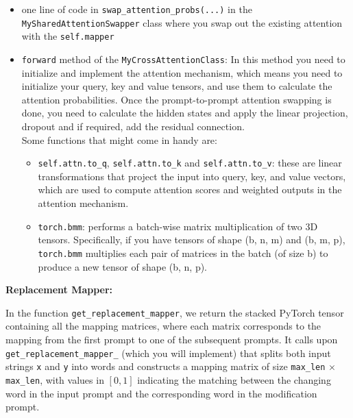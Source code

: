 \documentclass[11pt,addpoints,answers]{exam}
\begin{document}
\begin{questions}
\begin{itemize}
 
\item one line of code in \lstinline{swap_attention_probs(...)} in the \lstinline{MySharedAttentionSwapper} class where you swap out the existing attention with the \lstinline{self.mapper}
  
\item \lstinline{forward} method of the \lstinline{MyCrossAttentionClass}: In this method you need to initialize and implement the attention mechanism, which means you need to initialize your query, key and value tensors, and use them to calculate the attention probabilities. Once the prompt-to-prompt attention swapping is done, you need to calculate the hidden states and apply the linear projection, dropout and if required, add the residual connection. \\
Some functions that might come in handy are:
\begin{itemize}
    \item \lstinline{self.attn.to_q}, \lstinline{self.attn.to_k} and \lstinline{self.attn.to_v}: these are linear transformations that project the input into query, key, and value vectors, which are used to compute attention scores and weighted outputs in the attention mechanism.

    \item \lstinline{torch.bmm}: performs a batch-wise matrix multiplication of two 3D tensors. Specifically, if you have tensors of shape (b, n, m) and (b, m, p), \lstinline{torch.bmm} multiplies each pair of matrices in the batch (of size b) to produce a new tensor of shape (b, n, p). 
\end{itemize}

\end{itemize}


\textbf{Replacement Mapper:}

In the function \lstinline{get_replacement_mapper}, we return the stacked PyTorch tensor containing all the mapping matrices, where each matrix corresponds to the mapping from the first prompt to one of the subsequent prompts. It calls upon \lstinline{get_replacement_mapper_} (which you will implement) that splits both input strings \lstinline{x} and \lstinline{y} into words and constructs a mapping matrix of size \lstinline{max_len} $\times$ \lstinline{max_len}, with values in $[0,1]$ indicating the matching between the changing word in the input prompt and the corresponding word in the modification prompt.


\end{questions}
\end{document}
